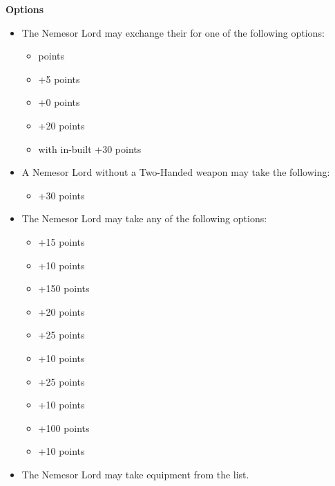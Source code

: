\begin{minipage}[t]{0.72\textwidth}
	\vspace*{2em}
	\textbf{Options}
	\begin{itemize}
		\item The Nemesor Lord may exchange their  for one of the following options:
		\begin{itemize}			
			\item {}  points
			\item {} \dotfill +5 points
			\item {} \dotfill +0 points
			\item {} \dotfill +20 points
			\item {} with in-built  \dotfill +30 points
		\end{itemize}
		\item A Nemesor Lord without a Two-Handed weapon may take the following:
		\begin{itemize}
			\item {} \dotfill +30 points
		\end{itemize}
		\item The Nemesor Lord may take any of the following options:
		\begin{itemize}
			\item {} \dotfill +15 points
			\item {} \dotfill +10 points
			\item {} \dotfill +150 points
			\item {} \dotfill +20 points
			\item {} \dotfill +25 points
			\item {} \dotfill +10 points
			\item {} \dotfill +25 points
			\item {} \dotfill +10 points
			\item {} \dotfill +100 points
			\item {} \dotfill +10 points
		\end{itemize}
		\item The Nemesor Lord may take equipment from the  list.
	\end{itemize}
\end{minipage}
\hspace{0.5em}

